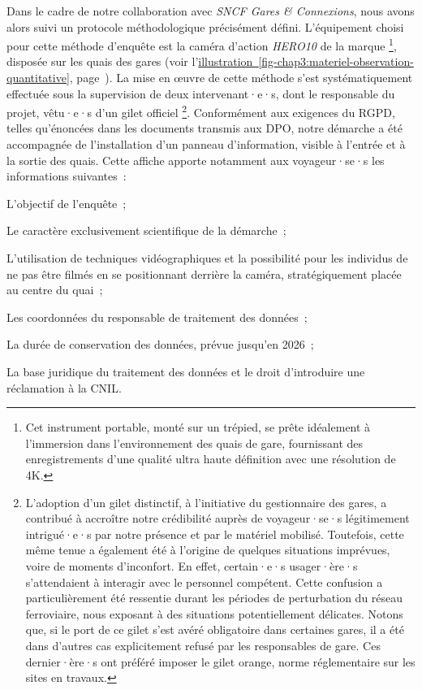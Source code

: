 \begin{refsegment}
Dans le cadre de notre collaboration avec \textsl{SNCF Gares \& Connexions}, nous avons alors suivi un protocole méthodologique précisément défini. L'équipement choisi pour cette méthode d'enquête est la caméra d'action \textsl{HERO10} de la marque \footnote{
Cet instrument portable, monté sur un trépied, se prête idéalement à l'immersion dans l'environnement des quais de gare, fournissant des enregistrements d'une qualité ultra haute définition avec une résolution de 4K.}, disposée sur les quais des gares (voir l'\hyperref[fig-chap3:materiel-observation-quantitative]{illustration~\ref{fig-chap3:materiel-observation-quantitative}}, page~\pageref{fig-chap3:materiel-observation-quantitative}). La mise en œuvre de cette méthode s'est systématiquement effectuée sous la supervision de deux intervenant·e·s, dont le responsable du projet, vêtu·e·s d'un gilet officiel \footnote{
L'adoption d'un gilet distinctif, à l'initiative du gestionnaire des gares, a contribué à accroître notre crédibilité auprès de voyageur·se·s légitimement intrigué·e·s par notre présence et par le matériel mobilisé. Toutefois, cette même tenue a également été à l'origine de quelques situations imprévues, voire de moments d'inconfort. En effet, certain·e·s usager·ère·s s'attendaient à interagir avec le personnel compétent. Cette confusion a particulièrement été ressentie durant les périodes de perturbation du réseau ferroviaire, nous exposant à des situations potentiellement délicates. Notons que, si le port de ce gilet s'est avéré obligatoire dans certaines gares, il a été dans d'autres cas explicitement refusé par les responsables de gare. Ces dernier·ère·s ont préféré imposer le gilet orange, norme réglementaire sur les sites en travaux.
}. Conformément aux exigences du \acrshort{RGPD}, telles qu'énoncées dans les documents transmis aux \acrshort{DPO}, notre démarche a été accompagnée de l'installation d'un panneau d'information, visible à l'entrée et à la sortie des quais. Cette affiche apporte notamment aux voyageur·se·s les informations suivantes~:
    \begin{customitemize}
\item L'objectif de l'enquête~;
\item Le caractère exclusivement scientifique de la démarche~;
\item L'utilisation de techniques vidéographiques et la possibilité pour les individus de ne pas être filmés en se positionnant derrière la caméra, stratégiquement placée au centre du quai~;
\item Les coordonnées du responsable de traitement des données~;
\item La durée de conservation des données, prévue jusqu'en 2026~;
\item La base juridique du traitement des données et le droit d'introduire une réclamation à la \acrshort{CNIL}.
    \end{customitemize}%


\end{refsegment}
